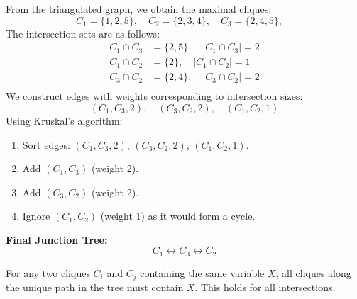 \documentclass{article}
\begin{document}
\begin{center}
\end{center}
From the triangulated graph, we obtain the maximal cliques:
\[
C_1 = \{1,2,5\}, \quad
C_2 = \{2,3,4\}, \quad
C_3 = \{2,4,5\}, \quad
\]
The intersection sets are as follows: 
\begin{align*}
C_1 \cap C_3 &= \{2,5\}, \quad |C_1 \cap C_3| = 2 \\
C_1 \cap C_2 &= \{2\}, \quad |C_1 \cap C_2| = 1 \\
C_3 \cap C_2 &= \{2,4\}, \quad |C_3 \cap C_2| = 2 \\
\end{align*}
We construct edges with weights corresponding to intersection sizes:
\[
(C_1, C_3, 2), \quad (C_3, C_2, 2), \quad (C_1, C_2, 1)
\]
Using Kruskal’s algorithm:
\begin{enumerate}
    \item Sort edges: $(C_1, C_3, 2)$, $(C_3, C_2, 2)$, $(C_1, C_2, 1)$.
    \item Add $(C_1, C_3)$ (weight 2).
    \item Add $(C_3, C_2)$ (weight 2).
    \item Ignore $(C_1, C_2)$ (weight 1) as it would form a cycle.
\end{enumerate}
\textbf{Final Junction Tree:}
\[
C_1 \leftrightarrow C_3 \leftrightarrow C_2
\]
\begin{center}
\end{center}
For any two cliques $C_i$ and $C_j$ containing the same variable $X$, all cliques along the unique path in the tree must contain $X$. This holds for all intersections.
\end{document}
